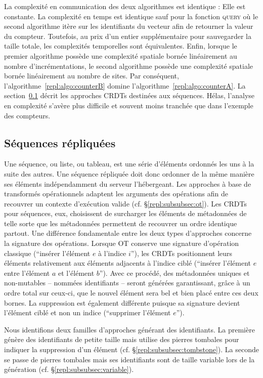 La complexité en communication des deux algorithmes est identique : Elle est
constante. La complexité en temps est identique sauf pour la fonction
\textsc{query} où le second algorithme itère sur les identifiants du vecteur
afin de retourner la valeur du compteur. Toutefois, au prix d'un entier
supplémentaire pour sauvegarder la taille totale, les complexités temporelles
sont équivalentes. Enfin, lorsque le premier algorithme possède une complexité
spatiale bornée linéairement au nombre d'incrémentations, le second algorithme
possède une complexité spatiale bornée linéairement au nombre de sites. Par
conséquent, l'algorithme~\ref{repl:algo:counterB} domine
l'algorithme~\ref{repl:algo:counterA}. La section~\ref{repl:subsec:sequences}
décrit les approches CRDTs destinées aux séquences. Hélas, l'analyse en
complexité s'avère plus difficile et souvent moins tranchée que dans l'exemple
des compteurs.


\subsection{Séquences répliquées}
\label{repl:subsec:sequences}

Une séquence, ou liste, ou tableau, est une série d'éléments ordonnés les uns à
la suite des autres. Une séquence répliquée doit donc ordonner de la même
manière ses éléments indépendamment du serveur l'hébergeant. Les approches à
base de transformés opérationnels adaptent les arguments des opérations afin de
recouvrer un contexte d'exécution valide (cf. §\ref{repl:subsubsec:ot}). Les
CRDTs pour séquences, eux, choisissent de surcharger les éléments de métadonnées
de telle sorte que les métadonnées permettent de recouvrer un ordre identique
partout. Une différence fondamentale entre les deux types d'approches concerne
la signature des opérations. Lorsque OT conserve une signature d'opération
classique (``insérer l'élément $e$ à l'indice $i$''), les CRDTs positionnent
leurs éléments relativement aux éléments adjacents à l'indice ciblé (``insérer
l'élément $e$ entre l'élément $a$ et l'élément $b$''). Avec ce procédé, des
métadonnées uniques et non-mutables -- nommées identifiants -- seront générées
garantissant, grâce à un ordre total sur ceux-ci, que le nouvel élément sera bel
et bien placé entre ces deux bornes. La suppression est également différente
puisque sa signature devient l'élément ciblé et non un indice (``supprimer
l'élément $e$'').

Nous identifions deux familles d'approches générant des identifiants. La
première génère des identifiants de petite taille mais utilise des pierres
tombales pour indiquer la suppression d'un élément
(cf. §\ref{repl:subsubsec:tombstone}). La seconde se passe de pierres tombales mais
ses identifiants sont de taille variable lors de la génération
(cf. §\ref{repl:subsubsec:variable}).

